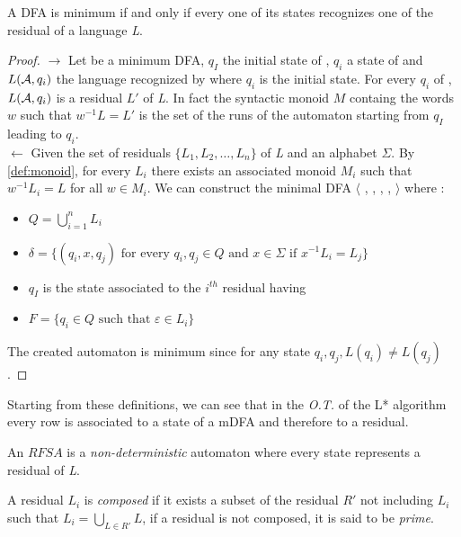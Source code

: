 \begin{theorem}
  A DFA is minimum if and only if every one of its states recognizes one of the residual of a language \textit{L}.
\end{theorem}

\begin{proof}
  $\rightarrow$ Let \automaton{} be a minimum DFA, $q_I$ the initial state of \automaton{}, $q_i$ a state of \automaton{} and $L(\mathcal{A}{}, q_i)$ the language recognized by \automaton{} where $q_i$ is the initial state. For every $q_i$ of \automaton{}, $L(\mathcal{A}{}, q_i)$ is a residual $L'$ of \textit{L}. In fact the syntactic monoid $M$ containg the words $w$ such that $w^{-1}L = L'$ is the set of the runs of the automaton starting from $q_I$ leading to $q_i$. \\
  $\leftarrow$ Given the set of residuals $\{L_1, L_2, \dots, L_n\}$ of \textit{L} and an alphabet $\Sigma$. By \cref{def:monoid}, for every $L_i$ there exists an associated monoid $M_i$ such that $w^{-1}L_i = L$ for all $w \in M_i$. We can construct the minimal DFA $\langle$ \alphabet{}, \states{}, \transition{}, \qzero{}, \qend{} $\rangle$ where :
  \begin{itemize}
    \item $Q = \bigcup_{i=1}^{n}L_i$
    \item $\delta = \{(q_i, x, q_j) \text{ for every } q_i, q_j \in Q \text{ and } x \in \Sigma \text{ if } x^{-1}L_i = L_j\}$
    \item $q_I$ is the state associated to the $i^{th}$ residual having
    \item $F = \{q_i \in Q \text{ such that } \varepsilon \in L_i\}$
  \end{itemize}
  The created automaton is minimum since for any state $q_i, q_j, L(q_i) \neq L(q_j)$.
\end{proof}

Starting from these definitions, we can see that in the \textit{O.T.} of the L* algorithm every row is associated to a state of a mDFA and therefore to a residual.

\begin{definition}
  An $RFSA$ is a \textit{non-deterministic} automaton where every state represents a residual of \textit{L}.
\end{definition}

\begin{definition}
  A residual $L_i$ is \textit{composed} if it exists a subset of the residual $R'$ not including $L_i$ such that $L_i = \bigcup_{L \in R'}L$, if a residual is not composed, it is said to be \textit{prime}.
\end{definition}

